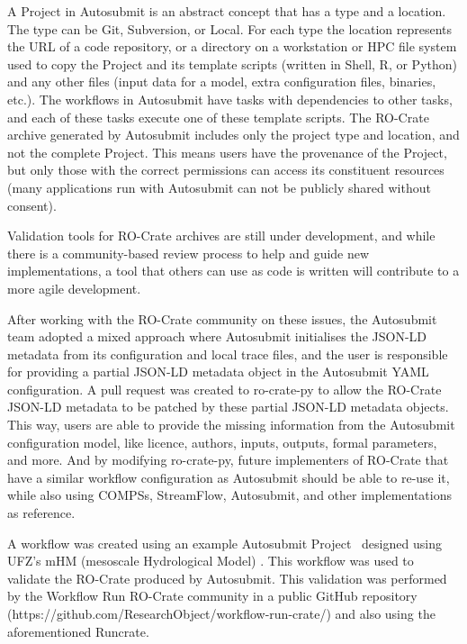\documentclass[10pt,letterpaper]{article}
\begin{document}
A Project in Autosubmit is an abstract concept that has a type and a location.
The type can be Git, Subversion, or Local.
For each type the location represents the URL of a code repository, or a directory on a workstation or HPC file system used to copy the Project and its template scripts (written in Shell, R, or Python) and any other files (input data for a model, extra configuration files, binaries, etc.).
The workflows in Autosubmit have tasks with dependencies to other tasks, and each of these tasks execute one of these template scripts.
The RO-Crate archive generated by Autosubmit includes only the project type and location, and not the complete Project.
This means users have the provenance of the Project, but only those with the correct permissions can access its constituent resources (many applications run with Autosubmit can not be publicly shared without consent).

Validation tools for RO-Crate archives are still under development, and while there is a community-based review process to help and guide new implementations, a tool that others can use as code is written will contribute to a more agile development.

After working with the RO-Crate community on these issues, the Autosubmit team adopted a mixed approach where Autosubmit initialises the JSON-LD metadata from its configuration and local trace files, and the user is responsible for providing a partial JSON-LD metadata object in the Autosubmit YAML configuration.
A pull request was created to ro-crate-py to allow the RO-Crate JSON-LD metadata to be patched by these partial JSON-LD metadata objects.
This way, users are able to provide the missing information from the Autosubmit configuration model, like licence, authors, inputs, outputs, formal parameters, and more.
And by modifying ro-crate-py, future implementers of RO-Crate that have a similar workflow configuration as Autosubmit should be able to re-use it, while also using COMPSs, StreamFlow, Autosubmit, and other implementations as reference.

A workflow was created using an example Autosubmit Project~\cite{Kinoshita 2023} designed using UFZ's mHM (mesoscale Hydrological Model)
\cite{Samaniego 2010,Kumar 2013}. This workflow was used to validate the RO-Crate produced by Autosubmit.
This validation was performed by the Workflow Run RO-Crate community in a public GitHub repository (https://github.com/ResearchObject/workflow-run-crate/) and also using the aforementioned Runcrate.
\end{document}
